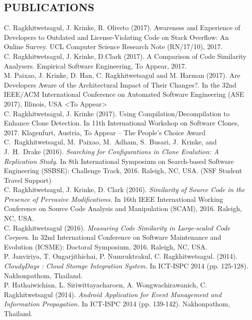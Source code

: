 \documentclass[margin, 10pt]{res} %
\begin{document}
\begin{resume}

\section{PUBLICATIONS}  
C. Ragkhitwetsagul, J. Krinke, R. Oliveto (2017). Awareness and Experience of Developers to Outdated and License-Violating Code on Stack Overflow: An Online Survey. UCL Computer Science Research Note (RN/17/10), 2017. \vspace{2mm} \\
C. Ragkhitwetsagul, J. Krinke, D.Clark (2017). A Comparison of Code Similarity Analysers. Empirical Software Engineering, To Appear, 2017. \vspace{2mm} \\
M. Paixao, J. Krinke, D. Han, C. Ragkhitwetsagul and M. Harman (2017). Are Developers Aware of the Architectural Impact of Their Changes?. In the 32nd IEEE/ACM International Conference on Automated Software Engineering (ASE 2017), Illinois, USA <To Appear> \vspace{2mm} \\
C. Ragkhitwetsagul, J. Krinke (2017). Using Compilation/Decompilation to Enhance Clone Detection. In 11th International Workshop on Software Clones, 2017. Klagenfurt, Austria, To Appear -- The People's Choice Award \vspace{2mm} \\
C.~Ragkhitwetsagul, M.~Paixao, M.~Adham, S.~Busari, J.~Krinke, and J.~H.~Drake (2016). \textit{Searching for Configurations in Clone Evalution: A Replication Study.} In 8th International Symposium on Search-based Software Engineering (SSBSE): Challenge Track, 2016. Raleigh, NC, USA. (NSF Student Travel Support) \vspace{2mm} \\
C. Ragkhitwetsagul, J. Krinke, D. Clark (2016). \textit{Similarity of Source Code in the Presence of Pervasive Modifications.} In 16th IEEE International Working Conference on Source Code Analysis and Manipulation (SCAM), 2016. Raleigh, NC, USA. \vspace{2mm} \\
C. Ragkhitwetsagul (2016). \textit{Measuring Code Similarity in Large-scaled Code Corpora.} In 32nd International Conference on Software Maintenance and Evolution (ICSME): Doctoral Symposium, 2016. Raleigh, NC, USA. \vspace{2mm} \\
P. Janviriya, T. Ongarjithichai, P. Numruktrakul, C. Ragkhitwetsagul. (2014). \textit{CloudyDays : Cloud Storage Integration System.} In ICT-ISPC 2014 (pp. 125-128). Nakhonpathom, Thailand. \vspace{2mm} \\
P. Hathaiwichian, L. Siriwittayacharoen, A. Wongwachirawanich, C. Ragkhitwetsagul (2014). \textit{Android Application for Event Management and Information Propagation.} In ICT-ISPC 2014 (pp. 139-142). Nakhonpathom, Thailand.


\end{resume}
\end{document}
